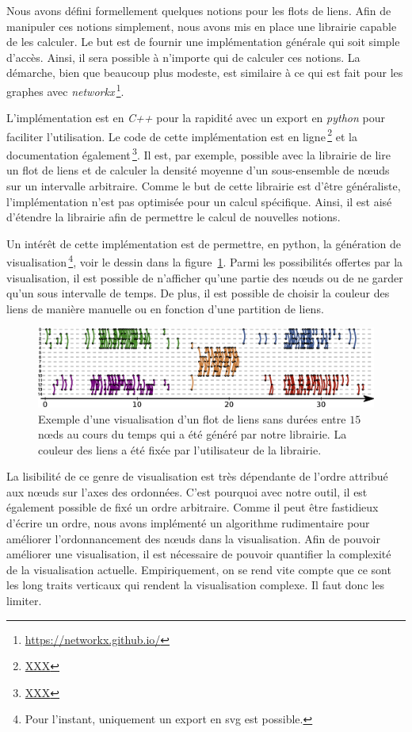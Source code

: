 Nous avons défini formellement quelques notions pour les flots de liens.
Afin de manipuler ces notions simplement, nous avons mis en place une librairie capable de les calculer.
Le but est de fournir une implémentation générale qui soit simple d'accès.
Ainsi, il sera possible à n'importe qui de calculer ces notions.
La démarche, bien que beaucoup plus modeste, est similaire à ce qui est fait pour les graphes avec \emph{networkx}\,\footnote{\url{https://networkx.github.io/}}.

L'implémentation est en \emph{C++} pour la rapidité avec un export en \emph{python} pour faciliter l'utilisation.
Le code de cette implémentation est en ligne\,\footnote{\url{XXX}} et la documentation également\,\footnote{\url{XXX}}.
Il est, par exemple, possible avec la librairie de lire un flot de liens et de calculer la densité moyenne d'un sous-ensemble de n\oe uds sur un intervalle arbitraire.
Comme le but de cette librairie est d'être généraliste, l'implémentation n'est pas optimisée pour un calcul spécifique.
Ainsi, il est aisé d'étendre la librairie afin de permettre le calcul de nouvelles notions.
 

Un intérêt de cette implémentation est de permettre, en python, la génération de visualisation\,\footnote{Pour  l'instant, uniquement un export en svg est possible.}, voir le dessin dans la figure~\ref{fig:exemple_Flot_de_liens_lib}.
Parmi les possibilités offertes par la visualisation, il est possible de n'afficher qu'une partie des n\oe uds ou de ne garder qu'un sous intervalle de temps.
De plus, il est possible de choisir la couleur des liens de manière manuelle ou en fonction d'une partition de liens.

\begin{figure}
\centering
\includegraphics[width=\linewidth]{img/Intro/Dessin_Flot.eps}
\caption{Exemple d'une visualisation d'un flot de liens sans durées entre $15$ n\oe ds au cours du temps qui a été généré par notre librairie.
La couleur des liens a été fixée par l'utilisateur de la librairie.
}
\label{fig:exemple_Flot_de_liens_lib}
\end{figure}

La lisibilité de ce genre de visualisation est très dépendante de l'ordre attribué aux n\oe uds sur l'axes des ordonnées.
C'est pourquoi avec notre outil, il est également possible de fixé un ordre arbitraire.
Comme il peut être fastidieux d'écrire un ordre, nous avons implémenté un algorithme rudimentaire pour améliorer l'ordonnancement des n\oe uds dans la visualisation.
Afin de pouvoir améliorer une visualisation, il est nécessaire de pouvoir quantifier la complexité de la visualisation actuelle.
Empiriquement, on se rend vite compte que ce sont les long traits verticaux qui rendent la visualisation complexe.
Il faut donc les limiter.

